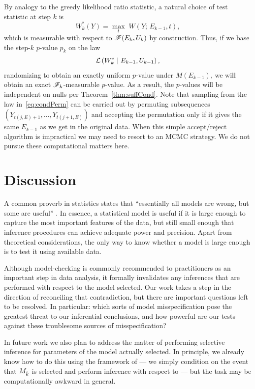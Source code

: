\documentclass{article}
\begin{document}
By analogy to the greedy likelihood ratio statistic, a natural choice of test statistic at step $k$ is
\[
W_k^*(Y) = \max_t \; W(Y; \, E_{k-1}, t),
\]
which is measurable with respect to $\mathscr{F}(E_k, U_k)$ by construction. Thus, if we base the step-$k$ $p$-value $p_k$ on the law
\begin{equation}\label{eq:condPerm}
\mathcal{L}\left(W_k^* \mid E_{k-1}, U_{k-1}\right),
\end{equation}
randomizing to obtain an exactly uniform $p$-value under $M(E_{k-1})$, we will obtain an exact $\mathscr{F}_k$-measurable $p$-value. As a result, the $p$-values will be independent on nulls per Theorem~\ref{thm:suffCond}. Note that sampling from the law in~\eqref{eq:condPerm} can be carried out by permuting subsequences $(Y_{t(j,E)+1}, \ldots, Y_{t(j+1,E)})$ and accepting the permutation only if it gives the same $E_{k-1}$ as we get in the original data. When this simple accept/reject algorithm is impractical we may need to resort to an MCMC strategy. We do not pursue these computational matters here.

\section{Discussion}
\label{sec:discussion}

A common proverb in statistics states that ``essentially all models are wrong, but some are useful'' \citep{box1987empirical}. In essence, a statistical model is useful if it is large enough to capture the most important features of the data, but still small enough that inference procedures can achieve adequate power and precision. Apart from theoretical considerations, the only way to know whether a model is large enough is to test it using available data.

Although model-checking is commonly recommended to practitioners as an important step in data analysis, it formally invalidates any inferences that are performed with respect to the model selected. Our work takes a step in the direction of reconciling that contradiction, but there are important questions left to be resolved. In particular: which sorts of model misspecification pose the greatest threat to our inferential conclusions, and how powerful are our tests against these troublesome sources of misspecification? 

In future work we also plan to address the matter of performing selective inference for parameters of the model actually selected. In principle, we already know how to do this using the framework of \citet{fithian2014optimal} --- we simply condition on the event that $M_{\hat{k}}$ is selected and perform inference with respect to  --- but the task may be computationally awkward in general.
\end{document}
